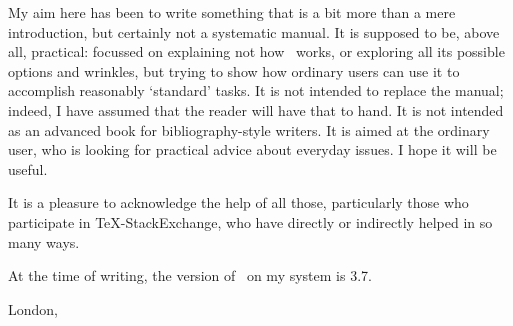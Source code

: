 My aim here has been to write something that is a bit more than a mere
introduction, but certainly not a systematic manual. It is supposed to
be, above all, practical: focussed on explaining not how \biblatex\
works, or exploring all its possible options and wrinkles, but trying
to show how ordinary users can use it to accomplish reasonably
`standard' tasks. It is not intended to replace the manual; indeed, I
have assumed that the reader will have that to hand. It is not
intended as an advanced book for bibliography-style writers. It is
aimed at the ordinary user, who is looking for practical advice about
everyday issues. I hope it will be useful.

It is a pleasure to acknowledge the help of all those, particularly
those who participate in \TeX-StackExchange, who have directly or
indirectly helped in so many ways.

At the time of writing, the version of \biblatex\ on my system is 3.7.

\hfill{}

\hfill{London, \prefacedate}

